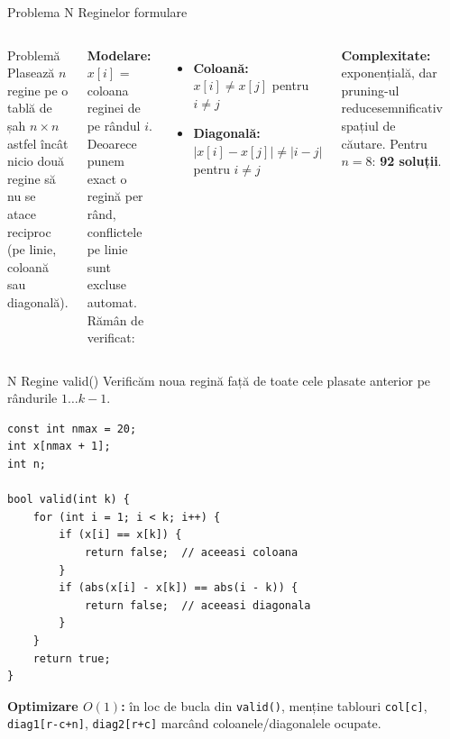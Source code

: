 ﻿\documentclass[10pt]{beamer}
\begin{document}
\begin{frame}{Problema N Reginelor \textemdash{} formulare}
  \begin{columns}[T]
  \begin{block}{Problemă}
    Plasează $n$ regine pe o tablă de șah $n \times n$ astfel încât
    nicio două regine să nu se atace reciproc (pe linie, coloană sau diagonală).
  \end{block}
  \smallskip
  \textbf{Modelare:} $x[i]$ = coloana reginei de pe rândul $i$.
  Deoarece punem exact o regină per rând, conflictele pe linie sunt
  excluse automat. Rămân de verificat:
  \begin{itemize}\itemsep2pt
    \item \textbf{Coloană:} $x[i] \neq x[j]$ pentru $i \neq j$
    \item \textbf{Diagonală:} $|x[i]-x[j]| \neq |i-j|$ pentru $i \neq j$
  \end{itemize}
  \smallskip
  \textbf{Complexitate:} exponențială, dar pruning-ul reducesemnificativ
  spațiul de căutare. Pentru $n = 8$: \textbf{92 soluții}.
  \begin{center}
  \end{center}
  \end{columns}
\end{frame}

\begin{frame}[fragile]{N Regine \textemdash{} valid()}
  Verificăm noua regină față de toate cele plasate anterior pe rândurile $1 \ldots k{-}1$.
  \begin{lstlisting}
const int nmax = 20;
int x[nmax + 1];
int n;

bool valid(int k) {
    for (int i = 1; i < k; i++) {
        if (x[i] == x[k]) {
            return false;  // aceeasi coloana
        }
        if (abs(x[i] - x[k]) == abs(i - k)) {
            return false;  // aceeasi diagonala
        }
    }
    return true;
}
  \end{lstlisting}
  \textbf{Optimizare $O(1)$:} în loc de bucla din \texttt{valid()}, menține tablouri
  \texttt{col[c]}, \texttt{diag1[r-c+n]}, \texttt{diag2[r+c]} marcând
  coloanele/diagonalele ocupate.
\end{frame}
\end{document}
